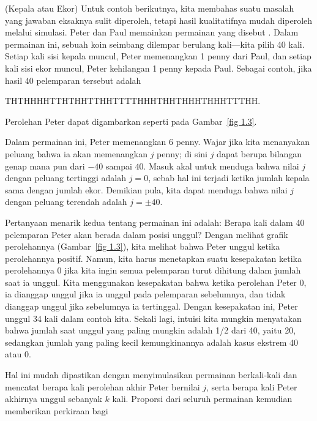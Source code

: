 \begin{example}(Kepala atau Ekor)\label{exam 1.3}
Untuk contoh berikutnya, kita membahas suatu masalah
yang jawaban eksaknya sulit diperoleh, tetapi hasil kualitatifnya mudah
diperoleh melalui simulasi.  Peter dan Paul memainkan permainan yang disebut .  Dalam permainan ini, sebuah koin seimbang dilempar berulang kali---kita pilih
40 kali.  Setiap kali sisi kepala muncul, Peter memenangkan 1 penny dari Paul, dan setiap kali sisi
ekor muncul, Peter kehilangan 1 penny kepada Paul.  Sebagai contoh, jika hasil
40 pelemparan tersebut adalah
\begin{center}
THTHHHHTTHTHHTTHHTTTTHHHTHHTHHHTHHHTTTHH.
\end{center}
\noindent Perolehan Peter dapat digambarkan seperti pada Gambar~\ref{fig 1.3}.
\par
Dalam permainan ini, Peter memenangkan 6 penny.  Wajar jika kita menanyakan
peluang bahwa ia akan memenangkan $j$ penny; di sini $j$ dapat berupa bilangan genap
mana pun dari $-40$ sampai $40$.  Masuk akal untuk menduga bahwa nilai $j$ dengan
peluang tertinggi adalah $j = 0$, sebab hal ini terjadi ketika jumlah kepala
sama dengan jumlah ekor.  Demikian pula, kita dapat menduga bahwa nilai $j$ dengan
peluang terendah adalah $j = \pm 40$.
\par
Pertanyaan menarik kedua tentang permainan ini adalah: Berapa kali
dalam 40 pelemparan Peter akan berada dalam posisi unggul?  Dengan melihat grafik
perolehannya (Gambar~\ref{fig 1.3}), kita melihat bahwa Peter unggul ketika perolehannya 
positif. Namun,
kita harus menetapkan suatu kesepakatan ketika perolehannya 0 jika kita ingin semua pelemparan
turut dihitung dalam jumlah saat ia unggul.  Kita menggunakan kesepakatan
bahwa ketika perolehan Peter 0, ia dianggap unggul jika ia unggul pada
pelemparan sebelumnya, dan tidak dianggap unggul jika sebelumnya ia tertinggal.  Dengan
kesepakatan ini, Peter unggul 34 kali dalam contoh kita.  Sekali lagi,
intuisi kita mungkin menyatakan bahwa jumlah saat unggul yang paling mungkin adalah
1/2 dari 40, yaitu 20, sedangkan jumlah yang paling kecil kemungkinannya adalah kasus ekstrem 40
atau 0.
\par
Hal ini mudah dipastikan dengan menyimulasikan permainan berkali-kali dan
mencatat berapa kali perolehan akhir Peter bernilai $j$, serta
berapa kali Peter akhirnya unggul sebanyak $k$ kali.  Proporsi
dari seluruh permainan kemudian memberikan perkiraan bagi

\end{example}
